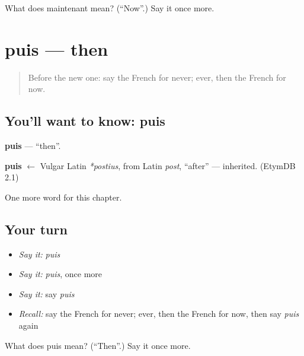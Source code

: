 \begin{tcolorbox}[breakable,colback=teal!4,colframe=teal!35!black,title={Before you move on}]
What does maintenant mean? (\textquotedblleft{}Now\textquotedblright{}.) Say it once more.
\end{tcolorbox}
\section[puis]{puis — then}

\label{lesson:FR-C96-puis}



\begin{quote}
Before the new one: say the French for never; ever, then the French for now.
\end{quote}

\subsection*{You'll want to know: puis}
\textbf{puis} — \textquotedblleft{}then\textquotedblright{}.

\begin{cousinweb}
\textbf{puis} $\leftarrow$ Vulgar Latin \emph{*postius}, from Latin \emph{post}, \textquotedblleft{}after\textquotedblright{} — inherited. (EtymDB 2.1)
\end{cousinweb}

\begin{grammarlens}[title={What you've built}]
One more word for this chapter.
\end{grammarlens}

\subsection*{Your turn}
\begin{itemize}
\raggedright
  \item \emph{Say it:} \emph{puis}
  \item \emph{Say it:} \emph{puis}, once more
  \item \emph{Say it:} say \emph{puis}
  \item \emph{Recall:} say the French for never; ever, then the French for now, then say \emph{puis} again
\end{itemize}

\begin{tcolorbox}[breakable,colback=teal!4,colframe=teal!35!black,title={Before you move on}]
What does puis mean? (\textquotedblleft{}Then\textquotedblright{}.) Say it once more.
\end{tcolorbox}
